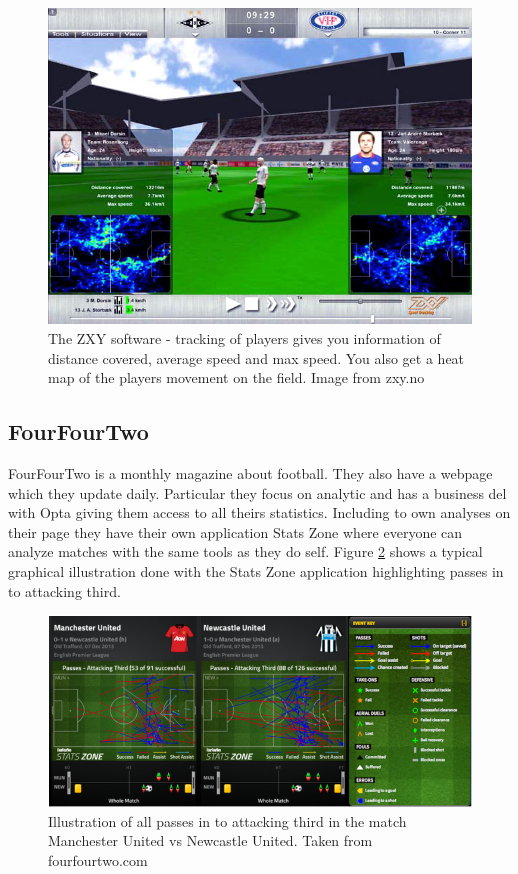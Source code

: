 \begin{figure}[ht!]
\centering
\includegraphics[width=1\textwidth]{images/general/zxysoftware.png}
\caption{The ZXY software - tracking of players gives you information of distance covered, average speed and max speed. You also get a heat map of the players movement on the field. Image from zxy.no}
\label{fig:zxysoftware}
\end{figure}


\subsection{FourFourTwo}

FourFourTwo is a monthly magazine about football. They also have a webpage which they update daily. Particular they focus on analytic and has a business del with Opta giving them access to all theirs statistics. Including to own analyses on their page they have their own application Stats Zone where everyone can analyze matches with the same tools as they do self. Figure \ref{fig:fourfourtwo} shows a typical
graphical illustration done with the Stats Zone application highlighting passes in to attacking third. 

\begin{figure}[ht!]
\centering
\includegraphics[width=1\textwidth]{images/general/fourfourtwo.png}
\caption{Illustration of all passes in to attacking third in the match Manchester United vs Newcastle United. Taken from fourfourtwo.com}
\label{fig:fourfourtwo}
\end{figure}

